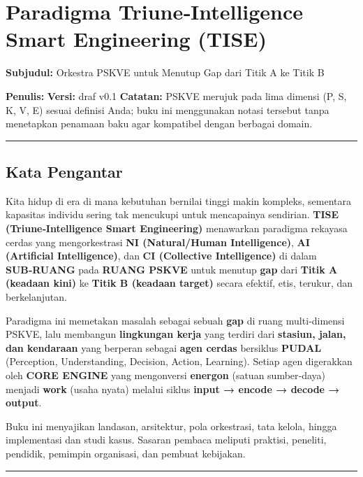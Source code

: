 \documentclass[
  letterpaper,
  DIV=11,
  numbers=noendperiod]{scrartcl}
\author{}
\date{}
\begin{document}
\section{Paradigma Triune‑Intelligence Smart Engineering
(TISE)}\label{paradigma-triuneintelligence-smart-engineering-tise}

\textbf{Subjudul:} Orkestra PSKVE untuk Menutup Gap dari Titik A ke
Titik B

\textbf{Penulis:} \textbf{Versi:} draf v0.1 \textbf{Catatan:} PSKVE
merujuk pada lima dimensi (P, S, K, V, E) sesuai definisi Anda; buku ini
menggunakan notasi tersebut tanpa menetapkan penamaan baku agar
kompatibel dengan berbagai domain.

\begin{center}\rule{0.5\linewidth}{0.5pt}\end{center}

\subsection{Kata Pengantar}\label{kata-pengantar}

Kita hidup di era di mana kebutuhan bernilai tinggi makin kompleks,
sementara kapasitas individu sering tak mencukupi untuk mencapainya
sendirian. \textbf{TISE (Triune‑Intelligence Smart Engineering)}
menawarkan paradigma rekayasa cerdas yang mengorkestrasi \textbf{NI
(Natural/Human Intelligence)}, \textbf{AI (Artificial Intelligence)},
dan \textbf{CI (Collective Intelligence)} di dalam \textbf{SUB‑RUANG}
pada \textbf{RUANG PSKVE} untuk menutup \textbf{gap} dari \textbf{Titik
A (keadaan kini)} ke \textbf{Titik B (keadaan target)} secara efektif,
etis, terukur, dan berkelanjutan.

Paradigma ini memetakan masalah sebagai sebuah \textbf{gap} di ruang
multi‑dimensi PSKVE, lalu membangun \textbf{lingkungan kerja} yang
terdiri dari \textbf{stasiun, jalan, dan kendaraan} yang berperan
sebagai \textbf{agen cerdas} bersiklus \textbf{PUDAL} (Perception,
Understanding, Decision, Action, Learning). Setiap agen digerakkan oleh
\textbf{CORE ENGINE} yang mengonversi \textbf{energon} (satuan
sumber‑daya) menjadi \textbf{work} (usaha nyata) melalui siklus
\textbf{input → encode → decode → output}.

Buku ini menyajikan landasan, arsitektur, pola orkestrasi, tata kelola,
hingga implementasi dan studi kasus. Sasaran pembaca meliputi praktisi,
peneliti, pendidik, pemimpin organisasi, dan pembuat kebijakan.

\begin{center}\rule{0.5\linewidth}{0.5pt}\end{center}
\end{document}
